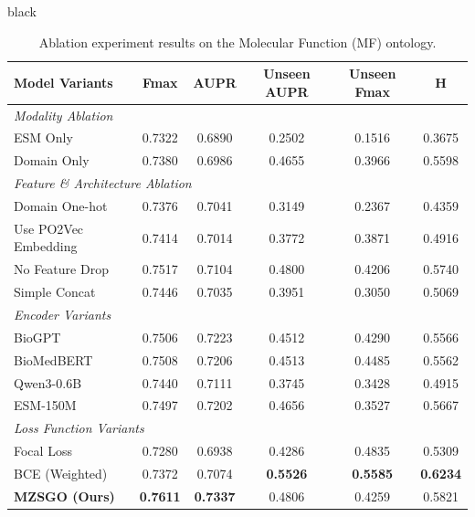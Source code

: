 \documentclass{article}
\begin{document}
\begin{color}{black}
\begin{table}[htbp]
    \centering
    \caption{Ablation experiment results on the Molecular Function (MF) ontology.}
    \label{tab:ablation_mf}
    \renewcommand{\arraystretch}{1.1}
    \begin{tabular}{l c c c c c}
        \toprule
        \textbf{Model Variants} & \textbf{Fmax} & \textbf{AUPR} & \textbf{Unseen AUPR} & \textbf{Unseen Fmax} & \textbf{H} \\
        \midrule
        \multicolumn{6}{l}{\textit{Modality Ablation}} \\
        ESM Only & 0.7322 & 0.6890 & 0.2502 & 0.1516 & 0.3675 \\
        Domain Only & 0.7380 & 0.6986 & 0.4655 & 0.3966 & 0.5598 \\
        \midrule
        \multicolumn{6}{l}{\textit{Feature \& Architecture Ablation}} \\
        Domain One-hot & 0.7376 & 0.7041 & 0.3149 & 0.2367 & 0.4359 \\
        Use PO2Vec Embedding & 0.7414 & 0.7014 & 0.3772 & 0.3871 & 0.4916 \\
        No Feature Drop & 0.7517 & 0.7104 & 0.4800 & 0.4206 & 0.5740 \\
        Simple Concat & 0.7446 & 0.7035 & 0.3951 & 0.3050 & 0.5069 \\
        \midrule
        \multicolumn{6}{l}{\textit{Encoder Variants}} \\
        BioGPT & 0.7506 & 0.7223 & 0.4512 & 0.4290 & 0.5566 \\
        BioMedBERT & 0.7508 & 0.7206 & 0.4513 & 0.4485 & 0.5562 \\
        Qwen3-0.6B & 0.7440 & 0.7111 & 0.3745 & 0.3428 & 0.4915 \\
        ESM-150M & 0.7497 & 0.7202 & 0.4656 & 0.3527 & 0.5667 \\
        \midrule
        \multicolumn{6}{l}{\textit{Loss Function Variants}} \\
        Focal Loss & 0.7280 & 0.6938 & 0.4286 & 0.4835 & 0.5309 \\
        BCE (Weighted) & 0.7372 & 0.7074 & \textbf{0.5526} & \textbf{0.5585} & \textbf{0.6234} \\
        \midrule
        \textbf{MZSGO (Ours)} & \textbf{0.7611} & \textbf{0.7337} & 0.4806 & 0.4259 & 0.5821 \\
        \bottomrule
    \end{tabular}
\end{table}
\end{color}
\end{document}
